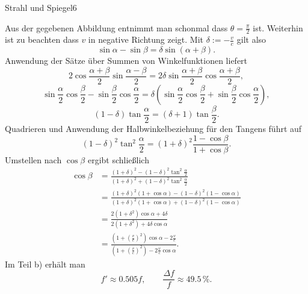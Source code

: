 \begin{problem}{Strahl und Spiegel}{6}
\begin{solution}
Aus der gegebenen Abbildung entnimmt man schonmal dass $\theta=\frac \pi 2$ ist. Weiterhin ist zu beachten dass $v$ in negative Richtung zeigt. Mit $\delta := - \frac vc$ gilt also
\[
\sin\alpha-\sin\beta = \delta\sin(\alpha + \beta).
\]
Anwendung der Sätze über Summen von Winkelfunktionen liefert
\[
2\cos{\frac{\alpha+\beta}2}\sin{\frac{\alpha-\beta}2}=2\delta\sin{\frac{\alpha+\beta}2}\cos{\frac{\alpha+\beta}2},
\]
\[
\sin{\frac{\alpha}2}\cos{\frac{\beta}2}-\sin{\frac{\beta}2}\cos{\frac{\alpha}2} = \delta(\sin{\frac{\alpha}2}\cos{\frac{\beta}2}+\sin{\frac{\beta}2}\cos{\frac{\alpha}2}),
\]
\[
(1-\delta)\tan{\frac{\alpha}2}=(\delta +1)\tan{\frac{\beta}2}.
\]
Quadrieren und Anwendung der Halbwinkelbeziehung für den Tangens führt auf
\[
(1-\delta)^2 \tan^2{\frac{\alpha}2} = (1+\delta)^2 \frac{1-\cos\beta}{1+\cos\beta}.
\]
Umstellen nach $\cos\beta$ ergibt schließlich
\[
\begin{split}
\cos\beta
&= \frac{(1+\delta)^2 - (1-\delta)^2 \tan^2{\frac{\alpha}2}}{(1+\delta)^2+ (1-\delta)^2 \tan^2{\frac{\alpha}2}}\\
&= \frac{(1+\delta)^2 (1+\cos\alpha) - (1-\delta)^2 (1-\cos\alpha)}{(1+\delta)^2 (1+\cos\alpha) + (1-\delta)^2 (1-\cos\alpha)}\\
&= \frac{2(1+\delta^2)\cos\alpha+4\delta}{2(1+\delta^2)+4\delta\cos\alpha}\\
&= \frac{(1+(\frac vc)^2)\cos\alpha - 2\frac vc}{(1+(\frac vc)^2) - 2\frac vc\cos\alpha}.
\end{split}
\]
Im Teil b) erhält man
\[
f' \approx 0.505 f, \qquad \frac{\Delta f}{f} \approx 49.5\,\%.
\]
\end{solution}
\end{problem}

